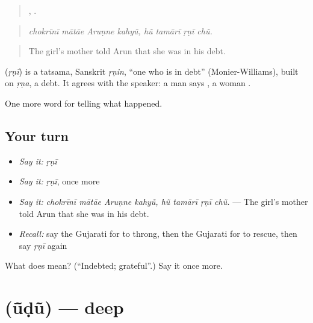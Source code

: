 \begin{quote}
   ,    .
\end{quote}

\begin{quote}
\emph{chokrīnī mātāe Aruṇne kahyũ, hũ tamārī ṛṇī chũ.}
\end{quote}

\begin{quote}
The girl's mother told Arun that she was in his debt.
\end{quote}

\begin{cousinweb}
\textbf{} (\emph{ṛṇī}) is a tatsama, Sanskrit \emph{ṛṇin}, \textquotedblleft{}one who is in debt\textquotedblright{} (Monier-Williams), built on \emph{ṛṇa}, a debt. It agrees with the speaker: a man says \textbf{   }, a woman \textbf{ }.
\end{cousinweb}

\begin{grammarlens}[title={What you've built}]
One more word for telling what happened.
\end{grammarlens}

\subsection*{Your turn}
\begin{itemize}
\raggedright
  \item \emph{Say it:} \emph{ṛṇī}
  \item \emph{Say it:} \emph{ṛṇī}, once more
  \item \emph{Say it:} \emph{chokrīnī mātāe Aruṇne kahyũ, hũ tamārī ṛṇī chũ.} — The girl's mother told Arun that she was in his debt.
  \item \emph{Recall:} say the Gujarati for to throng, then the Gujarati for to rescue, then say \emph{ṛṇī} again
\end{itemize}

\begin{tcolorbox}[breakable,colback=teal!4,colframe=teal!35!black,title={Before you move on}]
What does  mean? (\textquotedblleft{}Indebted; grateful\textquotedblright{}.) Say it once more.
\end{tcolorbox}
\section[\texorpdfstring{\gu{ઊંડું} (ū̃ḍũ)}{ઊંડું (ū̃ḍũ)}]{ (ū̃ḍũ) — deep}

